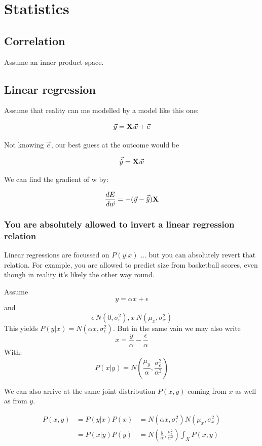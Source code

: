 \section{Statistics}

\subsection{Correlation}
Assume an inner product space.

\subsection{Linear regression}

Assume that reality can me modelled by a model like this one: 

$$ \vec{y} = \mathbf{X} \vec{w} + \vec{e} $$

Not knowing $\vec{e}$, our best guess at the outcome would be 

$$ \vec{\hat{y}} = \mathbf{X} \vec{w} $$

We can find the gradient of w by:

$$  \frac{ \mathop{dE} }{ \mathop{d\vec{w}} }  = -  (\vec{y} - \vec{\hat{y}}) \mathbf{X}  $$





\subsubsection{You are absolutely allowed to invert a linear regression relation}
Linear regressions are focussed on $P(y | x)$ ... but you can absolutely revert that relation. For example, you are allowed to predict size from basketball scores, even though in reality it's likely the other way round.

Assume 
$$ y = \alpha x + \epsilon $$
and 
$$ \epsilon ~ N(0, \sigma^2_\epsilon), x ~ N(\mu_x, \sigma^2_x)$$
This yields $P(y|x) = N(\alpha x, \sigma^2_\epsilon)$. But in the same vain we may also write
$$ x = \frac{y}{\alpha} - \frac{\epsilon}{\alpha} $$
With:
$$ P(x|y) = N(\frac{\mu_y}{\alpha},  \frac{\sigma^2_\epsilon}{\alpha^2}) $$

We can also arrive at the same joint distribution $P(x, y)$ coming from $x$ as well as from $y$.

\begin{equation}
    \begin{aligned}
        P(x, y) &= P(y|x) P(x) &= N(\alpha x, \sigma^2_\epsilon) N(\mu_x, \sigma^2_x) \\
                &= P(x|y) P(y) &= N( \frac{y}{\alpha}, \frac{\sigma^2_\epsilon}{\alpha^2} ) \int_X P(x, y)
    \end{aligned}
\end{equation}

